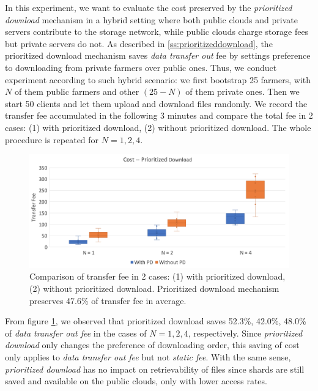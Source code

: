 In this experiment, we want to evaluate the cost preserved by the \textit{prioritized download} mechanism in a hybrid setting where both public clouds and private servers contribute to the storage network, while public clouds charge storage fees but private servers do not. As described in \ref{ss:prioritizeddownload}, the prioritized download mechanism saves \textit{data transfer out} fee by settings preference to downloading from private farmers over public ones. Thus, we conduct experiment according to such hybrid scenario: we first bootstrap 25 farmers, with $N$ of them public farmers and other $(25-N)$ of them private ones.  Then we start 50 clients and let them upload and download files randomly. We record the transfer fee accumulated in the following 3 minutes and compare the total fee in 2 cases: (1) with prioritized download, (2) without prioritized download. The whole procedure is repeated for $N = 1, 2, 4$.

\begin{figure}[hbt]
  \centering
    \includegraphics[width=14cm]{charts/chart_cost_prioritized_download.png}
    \caption[Comparison of transfer fee in 2 cases: (1) with prioritized download, (2) without prioritized download]{Comparison of transfer fee in 2 cases: (1) with prioritized download, (2) without prioritized download. Prioritized download mechanism preserves 47.6\% of transfer fee in average.}
    \label{fig:costprioritizeddownload}
\end{figure}

From figure \ref{fig:costprioritizeddownload}, we observed that prioritized download saves 52.3\%, 42.0\%, 48.0\% of \textit{data transfer out fee} in the cases of $N = 1, 2, 4$, respectively. Since \textit{prioritized download} only changes the preference of downloading order, this saving of cost only applies to \textit{data transfer out fee} but not \textit{static fee}. With the same sense, \textit{prioritized download} has no impact on retrievability of files since shards are still saved and available on the public clouds, only with lower access rates.



  